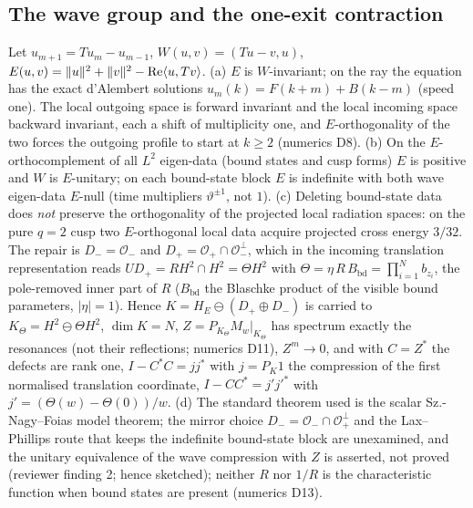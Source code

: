 \subsection{The wave group and the one-exit contraction}

\begin{theorem}
\label{thm:cusp-wave-contraction}
Let $u_{m+1} = Tu_m - u_{m-1}$, $W(u,v) = (Tu-v,u)$, $E(u,v) = \|u\|^2+\|v\|^2-\operatorname{Re}\langle u,Tv\rangle$.
(a) $E$ is $W$-invariant; on the ray the equation has the exact d'Alembert solutions
$u_m(k) = F(k+m)+B(k-m)$ (speed one). The local outgoing space is forward invariant and the local incoming
space backward invariant, each a shift of multiplicity one, and $E$-orthogonality of the two forces the
outgoing profile to start at $k\ge2$ (numerics D8). (b) On the $E$-orthocomplement of all $L^2$
eigen-data (bound states and cusp forms) $E$ is positive and $W$ is $E$-unitary; on each bound-state block
$E$ is indefinite with both wave eigen-data $E$-null (time multipliers $\vartheta^{\pm1}$, not $1$).
(c) Deleting bound-state data does \emph{not} preserve the orthogonality of the projected local radiation
spaces: on the pure $q = 2$ cusp two $E$-orthogonal local data acquire projected cross energy $3/32$.
The repair is $D_- = \mathcal O_-$ and $D_+ = \mathcal O_+\cap\mathcal O_-^{\perp}$, which in the incoming
translation representation reads $UD_+ = RH^2\cap H^2 = \Theta H^2$ with
$\Theta = \eta\,R\,B_{\mathrm{bd}} = \prod_{i=1}^N b_{z_i}$, the pole-removed inner part of $R$
($B_{\mathrm{bd}}$ the Blaschke product of the visible bound parameters, $|\eta| = 1$). Hence
$K = H_E\ominus(D_+\oplus D_-)$ is carried to $K_\Theta = H^2\ominus\Theta H^2$, $\dim K = N$,
$Z = P_{K_\Theta}M_w|_{K_\Theta}$ has spectrum exactly the resonances (not their reflections; numerics D11),
$Z^m\to0$, and with $C = Z^{*}$ the defects are rank one, $I - C^{*}C = jj^{*}$ with $j = P_K1$ the
compression of the first normalised translation coordinate, $I - CC^{*} = j'j'^{*}$ with
$j' = (\Theta(w)-\Theta(0))/w$. (d) The standard theorem used is the scalar Sz.-Nagy--Foias model theorem; the mirror choice $D_- = \mathcal O_-\cap\mathcal O_+^{\perp}$ and the Lax--Phillips route that keeps the indefinite bound-state block are unexamined, and the unitary equivalence of the wave compression with $Z$ is asserted, not proved (reviewer finding 2; hence sketched);
neither $R$ nor $1/R$ is the characteristic function when bound states are present (numerics D13).
\end{theorem}

